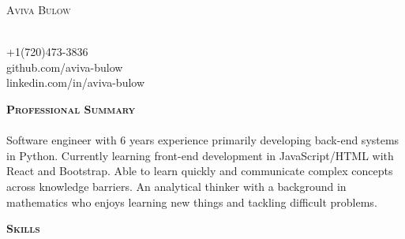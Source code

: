 \documentclass{article}
\newcommand{\lineunder}{\vspace*{-8pt} \\ \hspace*{-18pt} \hrulefill \\}
\newcommand{\header}[1]{{\vspace*{8pt}\hspace*{-16pt} \textsc{\textbf{\large{#1}}}} \vspace*{4pt} \lineunder \vspace*{4pt}}
\newcommand{\contact}[5]{
\begin{multicols}{2}
    \raggedcolumns
    \begin{flushleft}
    { \Huge \scshape {#1}}\\
    \end{flushleft}
    
\columnbreak

    \begin{flushright}
    #2 \\ #3 \\
    #4 \\ #5 \\
    \end{flushright}

\end{multicols}

}
\begin{document}
\small

\contact{Aviva Bulow}{}{+1(720)473-3836}{github.com/aviva-bulow}{linkedin.com/in/aviva-bulow}

\vspace{-10pt}

\header{Professional Summary}
Software engineer with 6 years experience primarily developing back-end systems in Python. Currently learning front-end development in JavaScript/HTML with React and Bootstrap. Able to learn quickly and communicate complex concepts across knowledge barriers. An analytical thinker with a background in mathematics who enjoys learning new things and tackling difficult problems. 

\header{Skills}
\vspace{-12pt}
\end{document}
